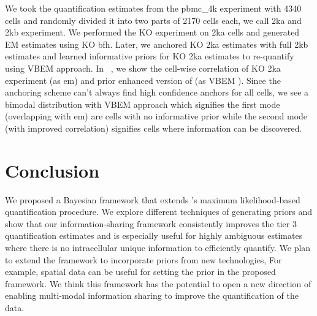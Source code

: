 We took the quantification estimates from the pbmc\_4k experiment with 4340 cells and randomly divided it into
two parts of 2170 cells each, we call 2ka and 2kb experiment. We performed the KO experiment on
2ka cells and generated \alevin EM estimates using KO bfh. Later, we anchored KO 2ka estimates 
with full 2kb estimates and learned informative priors for KO 2ka estimates to re-quantify using \alevin  VBEM 
approach. In ~, we show the cell-wise correlation of KO 2ka experiment (as em) and prior
enhanced version of \alevin (as  VBEM ). Since the anchoring scheme can't always find high confidence anchors for 
all cells, we see a bimodal distribution with VBEM approach which signifies the first mode (overlapping 
with em) are cells with no informative prior while the second mode (with improved correlation)
signifies cells where information can be discovered.

\section{Conclusion}
We proposed a Bayesian framework that extends \alevin 's maximum likelihood-based 
quantification procedure. We explore different techniques of generating priors and show that our 
information-sharing framework consistently improves the tier 3 \dscrnaseq quantification estimates and 
is especially useful for highly ambiguous estimates where there is no intracellular unique information to 
efficiently quantify. We plan to extend the framework to incorporate priors from new 
technologies, For example, spatial data can be useful for setting the prior in the proposed 
\alevin framework.  We think this framework has the potential to open a new direction of enabling 
multi-modal information sharing to improve the quantification of the data.